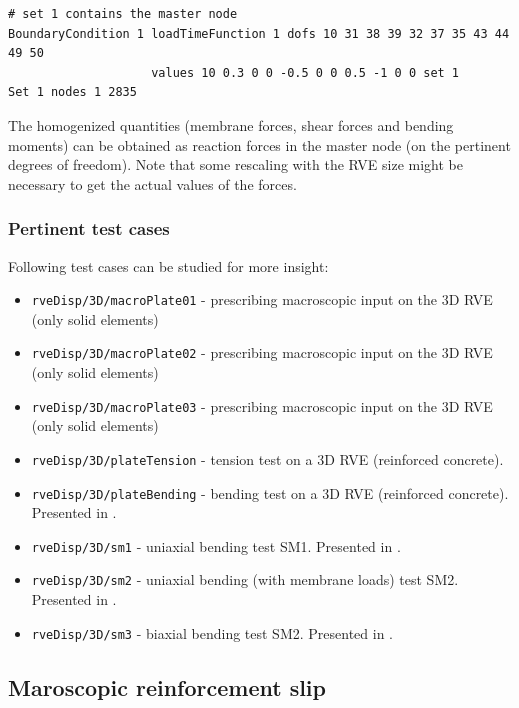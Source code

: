 \documentclass[11pt]{article}
\begin{document}
\begin{lstlisting}[style=oofem,language=oofeminput, caption={OOFEM input format in case of an Kirchhoff-Love problem at macroscale.}, label=lst:macroPlate]
# set 1 contains the master node
BoundaryCondition 1 loadTimeFunction 1 dofs 10 31 38 39 32 37 35 43 44 49 50 
                    values 10 0.3 0 0 -0.5 0 0 0.5 -1 0 0 set 1
Set 1 nodes 1 2835
\end{lstlisting}

\noindent The homogenized quantities (membrane forces, shear forces and bending moments) can be obtained as reaction forces in the master node (on the pertinent degrees of freedom). Note that some rescaling with the RVE size might be necessary to get the actual values of the forces.

\subsubsection{Pertinent test cases}
Following test cases can be studied for more insight: 
\begin{itemize}
    \item \texttt{rveDisp/3D/macroPlate01} - prescribing macroscopic input on the 3D RVE (only solid elements)
    \item \texttt{rveDisp/3D/macroPlate02} - prescribing macroscopic input on the 3D RVE (only solid elements)
    \item \texttt{rveDisp/3D/macroPlate03} - prescribing macroscopic input on the 3D RVE (only solid elements)
    \item \texttt{rveDisp/3D/plateTension} - tension test on a 3D RVE (reinforced concrete).
    \item \texttt{rveDisp/3D/plateBending} - bending test on a 3D RVE (reinforced concrete). Presented in \cite{PaperE}.
    \item \texttt{rveDisp/3D/sm1} - uniaxial bending test SM1. Presented in \cite{PaperE}.
    \item \texttt{rveDisp/3D/sm2} - uniaxial bending (with membrane loads) test SM2. Presented in \cite{PaperE}.
    \item \texttt{rveDisp/3D/sm3} - biaxial bending test SM2. Presented in \cite{PaperE}.
\end{itemize}


\subsection{Maroscopic reinforcement slip}
\label{sec:macroslip}
\end{document}
